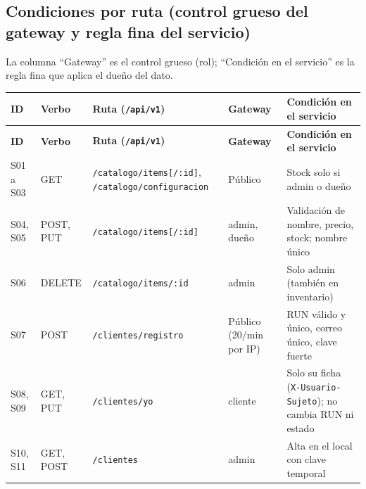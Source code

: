 \subsection{Condiciones por ruta (control grueso del gateway y regla fina del servicio)}

La columna “Gateway” es el control grueso (rol); “Condición en el servicio” es la regla fina que aplica el dueño del dato.


{\footnotesize
\setlength{\tabcolsep}{3pt}\renewcommand{\arraystretch}{1.15}
\begin{longtable}{|>{\raggedright\arraybackslash}p{}|>{\raggedright\arraybackslash}p{}|>{\raggedright\arraybackslash}p{}|>{\raggedright\arraybackslash}p{}|>{\raggedright\arraybackslash}p{}|}
\hline
\textbf{ID} & \textbf{Verbo} & \textbf{Ruta (\texttt{/\allowbreak{}api/\allowbreak{}v1})} & \textbf{Gateway} & \textbf{Condición en el servicio} \\ \hline
\endfirsthead
\hline
\textbf{ID} & \textbf{Verbo} & \textbf{Ruta (\texttt{/\allowbreak{}api/\allowbreak{}v1})} & \textbf{Gateway} & \textbf{Condición en el servicio} \\ \hline
\endhead
S01 a S03 & GET & \texttt{/\allowbreak{}catalogo/\allowbreak{}items[\allowbreak{}/\allowbreak{}:\allowbreak{}id]}, \texttt{/\allowbreak{}catalogo/\allowbreak{}configuracion} & Público & Stock solo si admin o dueño \\ \hline
S04, S05 & POST, PUT & \texttt{/\allowbreak{}catalogo/\allowbreak{}items[\allowbreak{}/\allowbreak{}:\allowbreak{}id]} & admin, dueño & Validación de nombre, precio, stock; nombre único \\ \hline
S06 & DELETE & \texttt{/\allowbreak{}catalogo/\allowbreak{}items/\allowbreak{}:\allowbreak{}id} & admin & Solo admin (también en inventario) \\ \hline
S07 & POST & \texttt{/\allowbreak{}clientes/\allowbreak{}registro} & Público (20/min por IP) & RUN válido y único, correo único, clave fuerte \\ \hline
S08, S09 & GET, PUT & \texttt{/\allowbreak{}clientes/\allowbreak{}yo} & cliente & Solo su ficha (\texttt{X-\allowbreak{}Usuario-\allowbreak{}Sujeto}); no cambia RUN ni estado \\ \hline
S10, S11 & GET, POST & \texttt{/\allowbreak{}clientes} & admin & Alta en el local con clave temporal \\ \hline

\end{longtable}}

